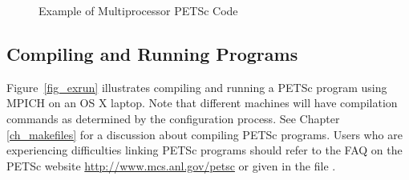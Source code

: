 {{\begin{figure}[H]
{
  
}
\nobreak
  \caption{Example of Multiprocessor PETSc Code}
\label{fig_example2}
\end{figure}

\subsection*{Compiling and Running Programs}

Figure~\ref{fig_exrun} illustrates compiling and running a PETSc program
using MPICH on an OS X laptop.  Note that different machines will have
compilation commands as determined by the configuration process.  See Chapter \ref{ch_makefiles}
for a discussion about compiling PETSc programs.
Users who are experiencing difficulties linking PETSc programs should
refer to the FAQ on the PETSc website
\href{http://www.mcs.anl.gov/petsc}{http://www.mcs.anl.gov/petsc} or
given in the file .

}}
